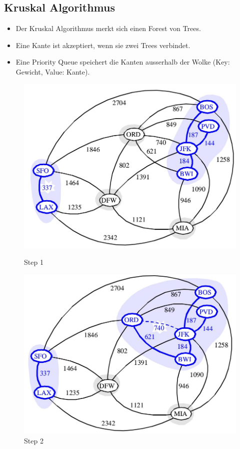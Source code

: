 \subsection{Kruskal Algorithmus}
\begin{itemize}
	\item Der Kruskal Algorithmus merkt sich einen Forest von Trees. 
	\item Eine Kante ist akzeptiert, wenn sie zwei Trees verbindet. 
	\item Eine Priority Queue speichert die Kanten ausserhalb der Wolke (Key: Gewicht, Value: Kante).
\end{itemize}
\begin{figure}[ht!]
	\centering
	\begin{minipage}[t]{0.4\textwidth}
		\centering
		\includegraphics[width=0.9\linewidth]{images/kruskal_s1}
		\caption{Step 1}
		\label{fig:kruskals1}
	\end{minipage}
	\begin{minipage}[t]{0.4\textwidth}
		\centering
		\includegraphics[width=0.9\linewidth]{images/kruskal_s2}
		\caption{Step 2}
		\label{fig:kruskals2}
	\end{minipage}
\end{figure}

